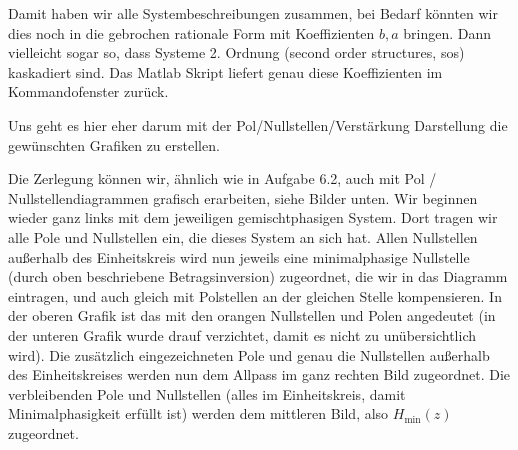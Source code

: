 \begin{Loesung}
Damit haben wir alle Systembeschreibungen zusammen,
bei Bedarf könnten wir dies noch in die gebrochen rationale Form
mit Koeffizienten $b,a$ bringen. Dann vielleicht sogar so, dass Systeme 2. Ordnung
(second order structures, sos) kaskadiert sind. Das Matlab Skript liefert
genau diese Koeffizienten im Kommandofenster zurück.

Uns geht es hier eher darum mit der Pol/Nullstellen/Verstärkung Darstellung
die gewünschten Grafiken zu erstellen.

Die Zerlegung können wir, ähnlich wie in Aufgabe 6.2, auch mit
Pol / Nullstellendiagrammen grafisch erarbeiten, siehe Bilder unten.
Wir beginnen wieder ganz links mit dem jeweiligen gemischtphasigen System.
Dort tragen wir alle Pole und Nullstellen ein, die dieses System an sich
hat. Allen Nullstellen außerhalb des Einheitskreis wird nun jeweils
eine minimalphasige Nullstelle (durch oben beschriebene Betragsinversion)
zugeordnet, die wir in das Diagramm eintragen, und auch gleich
mit Polstellen an der gleichen Stelle kompensieren.
%
In der oberen Grafik ist das mit den orangen
Nullstellen und Polen angedeutet (in der unteren Grafik wurde drauf verzichtet,
damit es nicht zu unübersichtlich wird). Die zusätzlich eingezeichneten Pole
und genau die Nullstellen außerhalb des Einheitskreises werden nun dem Allpass
im ganz rechten Bild zugeordnet.
Die verbleibenden Pole und Nullstellen (alles im Einheitskreis, damit
Minimalphasigkeit erfüllt ist) werden dem mittleren Bild, also $H_\mathrm{min}(z)$
zugeordnet.


\end{Loesung}

